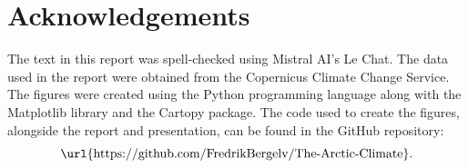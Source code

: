\appendix
\section{Acknowledgements}
\label{github}
The text in this report was spell-checked using Mistral AI's Le Chat. The data used in the report were obtained from the Copernicus Climate Change Service. The figures were created using the Python programming language along with the Matplotlib library and the Cartopy package. The code used to create the figures, alongside the report and presentation, can be found in the GitHub repository: 
\begin{equation*}
\text{\url{https://github.com/FredrikBergelv/The-Arctic-Climate}}.
\end{equation*}